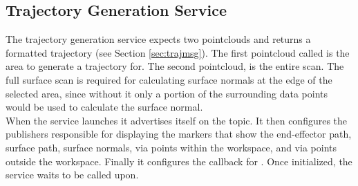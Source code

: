 \subsection{Trajectory Generation  Service}
The trajectory generation service expects two pointclouds and returns a  formatted trajectory (see Section \ref{sec:trajmsg}). The first pointcloud called  is the area to generate a trajectory for. The second pointcloud,  is the entire scan. The full surface scan is required for calculating surface normals at the edge of the selected area, since without it only a portion of the surrounding data points would be used to calculate the surface normal.\\

When the service launches it advertises itself on the  topic. It then configures the publishers responsible for displaying the markers that show the end-effector path, surface path, surface normals, via points within the workspace, and via points outside the workspace. Finally it configures the callback for . Once initialized, the service waits to be called upon.\\

